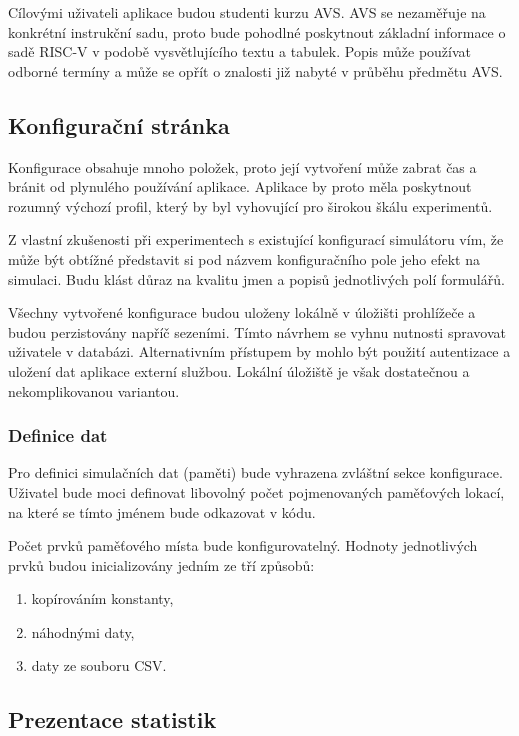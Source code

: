 Cílovými uživateli aplikace budou studenti kurzu AVS.
AVS se nezaměřuje na konkrétní instrukční sadu, proto bude pohodlné poskytnout základní informace o sadě RISC-V v podobě vysvětlujícího textu a tabulek.
Popis může používat odborné termíny a může se opřít o znalosti již nabyté v průběhu předmětu AVS.

\subsection{Konfigurační stránka}

Konfigurace obsahuje mnoho položek, proto její vytvoření může zabrat čas a bránit od plynulého používání aplikace.
Aplikace by proto měla poskytnout rozumný výchozí profil, který by byl vyhovující pro širokou škálu experimentů.

Z vlastní zkušenosti při experimentech s existující konfigurací simulátoru vím, že může být obtížné představit si pod názvem konfiguračního pole jeho efekt na simulaci.
Budu klást důraz na kvalitu jmen a popisů jednotlivých polí formulářů.

Všechny vytvořené konfigurace budou uloženy lokálně v úložišti prohlížeče a budou perzistovány napříč sezeními.
Tímto návrhem se vyhnu nutnosti spravovat uživatele v databázi.
Alternativním přístupem by mohlo být použití autentizace a uložení dat aplikace externí službou.
Lokální úložiště je však dostatečnou a nekomplikovanou variantou.

\subsubsection{Definice dat}

Pro definici simulačních dat (paměti) bude vyhrazena zvláštní sekce konfigurace. 
Uživatel bude moci definovat libovolný počet pojmenovaných paměťových lokací, na které se tímto jménem bude odkazovat v kódu.

Počet prvků paměťového místa bude konfigurovatelný.
Hodnoty jednotlivých prvků budou inicializovány jedním ze tří způsobů:
\begin{enumerate}
    \item kopírováním konstanty,
    \item náhodnými daty,
    \item daty ze souboru CSV.
\end{enumerate}

\subsection{Prezentace statistik}

